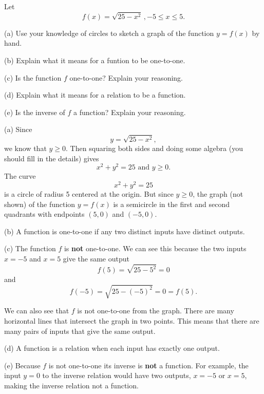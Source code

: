 \documentclass{ximera}
\begin{document}
\begin{example}     \label{Ex99:Quadratics}
Let 
\[
   f(x) = \sqrt{25-x^2} \, , -5 \leq x \leq 5 .
\]

(a) Use your knowledge of circles to sketch a graph of the function $y=f(x)$ by hand.

(b) Explain what it means for a funtion to be one-to-one.

(c) Is the function $f$ one-to-one? Explain your reasoning.

(d) Explain what it means for a relation to be a function.

(e) Is the inverse of $f$ a function? Explain your reasoning.

\begin{explanation}

(a) Since 
\[
    y = \sqrt{25-x^2},
\]
we know that $y \geq 0$. Then squaring both sides and doing some algebra (you should fill in the details) gives
\[
    x^2 + y^2 =25 \text{ and } y\geq 0.
\]
The curve 
\[
   x^2 + y^2 = 25
\]
is a circle of radius 5 centered at the origin. But since $y\geq 0$, the graph (not shown) of the function $y=f(x)$ is a semicircle in the first and second quadrants with endpoints $(5,0)$ and $(-5,0)$.

(b) A function is one-to-one if any two distinct inputs have distinct outputs.

(c) The function $f$ is {\bf not} one-to-one. We can see this because the two inputs $x=-5$ and $x=5$ give the same output
\[
     f(5) = \sqrt{25-5^2} = 0 
\]
and
\[
     f(-5) = \sqrt{25-(-5)^2} = 0 = f(5). 
\]

We can also see that $f$ is not one-to-one from the graph. There are many horizontal lines that intersect the graph in two points. This means that there are many pairs of inputs that give the same output.

(d) A function is a relation when each input has exactly one output.

(e) Because $f$ is not one-to-one its inverse is {\bf not} a function. For example, the input $y=0$ to the inverse relation would have two outputs, $x=-5$ or $x=5$, making the inverse relation not a function.

\end{explanation}

\end{example}
\end{document}
